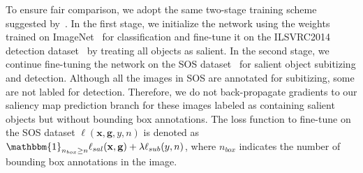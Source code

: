 \documentclass[10pt,twocolumn,letterpaper]{article}
\begin{document}
To ensure fair comparison, we adopt the same two-stage training scheme suggested by~\cite{zhang2015SOD}. In the first stage, we initialize the network using the weights trained on ImageNet~\cite{DBLP:conf/cvpr/DengDSLL009} for classification and fine-tune it on the ILSVRC2014 detection dataset~\cite{ILSVRC15} by treating all objects as salient. 
In the second stage, we continue fine-tuning the network on the SOS dataset~\cite{DBLP:conf/cvpr/ZhangMSSBLSPM15} for salient object subitizing and detection. Although all the images in SOS are annotated for subitizing, some are not labled for detection. Therefore, we do not back-propagate gradients to our saliency map prediction branch for these images labeled as containing salient objects but without bounding box annotations. The loss function to fine-tune on the SOS dataset $\ell(\mathbf{x},\mathbf{g},y,n)$ is denoted as $\mathbbm{1}_{n_{box}\ge n} \ell_{sal}(\mathbf{x},\mathbf{g}) + \lambda \ell_{sub}(y,n)$,
where $n_{box}$ indicates the number of bounding box annotations in the image.
\end{document}
